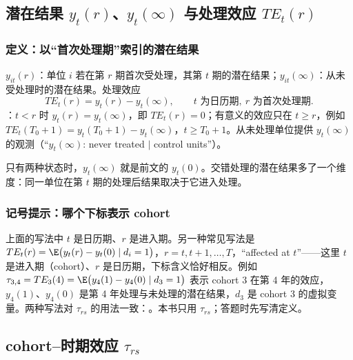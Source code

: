 \subsection{潜在结果 \texorpdfstring{$y_t(r)$}{y\_t(r)}、\texorpdfstring{$y_t(\infty)$}{y\_t(inf)} 与处理效应 \texorpdfstring{$TE_t(r)$}{TE\_t(r)}}

\subsubsection{定义：以“首次处理期”索引的潜在结果}

\begin{defn}[交错处理下的潜在结果与处理效应]\label{def:U15b-po}
$y_{it}(r)$：单位 $i$ 若在第 $r$ 期首次受处理，其第 $t$ 期的潜在结果；$y_{it}(\infty)$：从未受处理时的潜在结果。处理效应
\[
TE_t(r)=y_t(r)-y_t(\infty),\qquad t\text{ 为日历期},\ r\text{ 为首次处理期}.
\]
：$t<r$ 时 $y_t(r)=y_t(\infty)$，即 $TE_t(r)=0$；有意义的效应只在 $t\ge r$，例如 $TE_t(T_0+1)=y_t(T_0+1)-y_t(\infty)$，$t\ge T_0+1$。从未处理单位提供 $y_t(\infty)$ 的观测（“$y_t(\infty)$: never treated $\mid$ control units”）。
\end{defn}

只有两种状态时，$y_t(\infty)$ 就是前文的 $y_t(0)$。交错处理的潜在结果多了一个维度：同一单位在第 $t$ 期的处理后结果取决于它进入处理。

\subsubsection{记号提示：哪个下标表示 cohort}

\begin{note}[$TE_t(r)$ 的两种下标用法]
上面的写法中 $t$ 是日历期、$r$ 是进入期。另一种常见写法是 $TE_t(r)=\E\bigl(y_t(r)-y_t(0)\mid d_i=1\bigr)$，$r=t,t+1,\dots,T$，“affected at $t$”——这里 $t$ 是进入期（cohort）、$r$ 是日历期，下标含义恰好相反。例如 $\tau_{3,4}=TE_3(4)=\E\bigl(y_4(1)-y_4(0)\mid d_3=1\bigr)$ 表示 cohort 3 在第 4 年的效应，$y_4(1)$、$y_4(0)$ 是第 4 年处理与未处理的潜在结果，$d_3$ 是 cohort 3 的虚拟变量。两种写法对 $\tau_{rs}$ 的用法一致：。本书只用 $\tau_{rs}$；答题时先写清定义。
\end{note}

\subsection{cohort--时期效应 \texorpdfstring{$\tau_{rs}$}{tau\_rs}}

